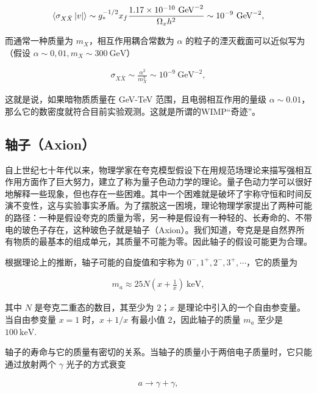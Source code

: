 \documentclass{beamer} %
\begin{document}
\begin{frame}
\begin{align}
\Braket{\sigma_{X\bar{X}}\left|v \right|}
\sim g_*^{-1/2} x_f \frac{1.17 \times 10^{-10} ~\mathrm{GeV}^{-2} }{\Omega_x h^2 } \sim 10^{-9}~\mathrm{GeV}^{-2}, 
\end{align}

而通常一种质量为 $m_X$，相互作用耦合常数为 $\alpha$ 的粒子的湮灭截面可以近似写为（假设 $\alpha\sim 0,01,m_X\sim 300~\mathrm{GeV}$）

\begin{align}
\sigma_{X\bar{X}} \sim \frac{\alpha^2 }{m_X^2 } \sim 10^{-9}~\mathrm{GeV}^{-2},
\end{align}

这就是说，如果暗物质质量在 GeV-TeV 范围，且电弱相互作用的量级 $\alpha\sim 0.01$，那么它的数密度就符合目前实验观测。这就是所谓的WIMP“奇迹”。
\end{frame}

\subsection{轴子（Axion）}

\begin{frame}
自上世纪七十年代以来，物理学家在夸克模型假设下在用规范场理论来描写强相互作用方面作了巨大努力，建立了称为量子色动力学的理论。量子色动力学可以很好地解释一些现象，但也存在一些困难。其中一个困难就是破坏了宇称守恒和时间反演不变性，这与实验事实矛盾。为了摆脱这一困境，理论物理学家提出了两种可能的路径：一种是假设夸克的质量为零，另一种是假设有一种轻的、长寿命的、不带电的玻色子存在，这种玻色子就是轴子（Axion）。我们知道，夸克是是自然界所有物质的最基本的组成单元，其质量不可能为零。因此轴子的假设可能更为合理。
\end{frame}

\begin{frame}
根据理论上的推断，轴子可能的自旋值和宇称为 $0^-,1^+,2^-,3^+,\cdots$，它的质量为

\begin{align}
m_a
\approx 25 N \left(x+\frac{1 }{x }  \right)~\mathrm{keV},
\end{align}

其中 $N$ 是夸克二重态的数目，其至少为 $2$；$x$ 是理论中引入的一个自由参变量。当自由参变量 $x=1$ 时，$x+1/x$ 有最小值 $2$，因此轴子的质量 $m_a$ 至少是 $100~\mathrm{keV} .$

轴子的寿命与它的质量有密切的关系。当轴子的质量小于两倍电子质量时，它只能通过放射两个 $\gamma$ 光子的方式衰变

\begin{align}
a \to \gamma + \gamma,
\end{align}
\end{frame}
\end{document}
